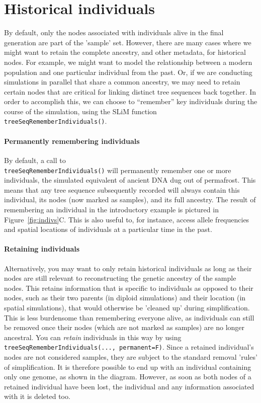 \documentclass[12pt]{article}
\begin{document}
\section*{Historical individuals}
By default, only the nodes associated with individuals alive in the final generation are part of the 'sample' set.
However, there are many cases where we might want to retain the complete ancestry, and other metadata, for
historical nodes. For example, we might want to model the relationship between a modern population and
one particular individual from the past. Or, if we are conducting simulations in parallel that share 
a common ancestry, we may need to retain certain nodes that are critical for linking distinct
tree sequences back together.
In order to accomplish this, we can choose to ``remember'' key individuals during the course of the simulation,
using the SLiM function \verb|treeSeqRememberIndividuals()|.

\paragraph{Permanently remembering individuals}
By default, a call to \\ 
\verb|treeSeqRememberIndividuals()| will permanently remember one or more individuals,
the simulated equivalent of ancient DNA dug out of permafrost.
This means that any tree sequence subsequently recorded will always contain this individual,
its nodes (now marked as samples), and its full ancestry.
The result of remembering an individual in the introductory example is pictured
in Figure~\ref{fig:indivs}C.
This is also useful to, for instance, access allele frequencies and spatial locations of individuals
at a particular time in the past.

\paragraph{Retaining individuals}
Alternatively, you may want to only retain historical individuals as long as their nodes are still
relevant to reconstructing the genetic ancestry of the sample nodes.
This retains information that is specific to individuals as opposed to their nodes,
such as their two parents (in diploid simulations) and their location (in spatial simulations), that would otherwise be 'cleaned up' during simplification.
This is less burdensome than remembering everyone alive, as individuals can still be removed once their
nodes (which are not marked as samples) are no longer ancestral.
You can \emph{retain} individuals in this way by using
\verb|treeSeqRememberIndividuals(..., permanent=F)|.
Since a retained individual's nodes are not considered samples,
they are subject to the standard removal 'rules' of simplification.
It is therefore possible to end up with an individual containing only one genome, as shown in the diagram.
However, as soon as both nodes of a retained individual have been lost,
the individual and any information associated with it is deleted too.
\end{document}
